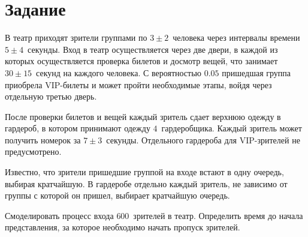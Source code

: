 \chapter{Задание}

В театр приходят зрители группами по $3\pm2$~человека через интервалы времени
$5\pm4$~секунды. Вход в театр осуществляется через две двери, в каждой из
которых осуществляется проверка билетов и досмотр вещей, что занимает
$30\pm15$~секунд на каждого человека. С вероятностью $0.05$ пришедшая группа
приобрела VIP-билеты и может пройти необходимые этапы, войдя через отдельную
третью дверь.

После проверки билетов и вещей каждый зритель сдает верхнюю одежду в гардероб, в
котором принимают одежду $4$~гардеробщика. Каждый зритель может получить номерок
за $7\pm3$~секунды. Отдельного гардероба для VIP-зрителей не предусмотрено.

Известно, что зрители пришедшие группой на входе встают в одну очередь, выбирая
кратчайшую. В гардеробе отдельно каждый зритель, не зависимо от группы с которой
он пришел, выбирает кратчайшую очередь.

Смоделировать процесс входа $600$~зрителей в театр. Определить время до начала
представления, за которое необходимо начать пропуск зрителей.

